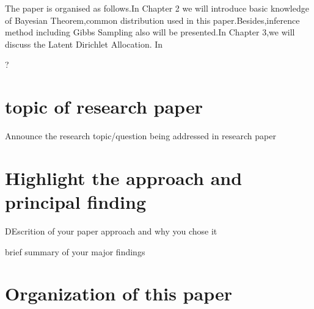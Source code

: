 The paper is organised as follows.In Chapter 2 we will introduce basic knowledge of Bayesian Theorem,common distribution used in this paper.Besides,inference method including Gibbs Sampling also will be presented.In Chapter 3,we will discuss the Latent Dirichlet Allocation.
In 


?

\section{topic of research paper}
Announce the research topic/question being addressed in research paper


\section{Highlight the approach and principal finding}

DEscrition of your paper approach and why you chose it

brief summary of your major findings

\section{Organization of this paper}
